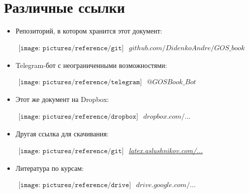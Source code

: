 {\let\clearpage\relax\chapter{Различные ссылки}}
\begin{itemize}
\item

Репозиторий, в котором хранится этот документ:

$
\begin{array}{l}
\texttt{[image: pictures/reference/git]}
\end{array}
$ \href{https://github.com/DidenkoAndre/GOS_book}{$github.com/DidenkoAndre/GOS\_book$}

\item

Telegram-бот с неограниченными возможностями:

$
\begin{array}{l}
\texttt{[image: pictures/reference/telegram]}
\end{array}
$
\href{https://t.me/GOSBook_Bot}{\textcolor{Purplemountainmajesty}{$@GOSBook\_Bot$}} 

\item

Этот же документ на Dropbox:

$
\begin{array}{l}
\texttt{[image: pictures/reference/dropbox]}
\end{array}
$ \href{https://www.dropbox.com/sh/7e5mfj8q68o2ipp/AAD8XvpZhiJzFbEh_IeH305ia?dl=0&preview=GOSBook.pdf}{$dropbox.com/...$}

\item 

Другая ссылка для скачивания:

$
\begin{array}{l}
\texttt{[image: pictures/reference/git]}
\end{array}
$
\href{http://latex.aslushnikov.com/compile?git=https://github.com/DidenkoAndre/GOS_book&target=GOSBook.tex}{\large \textcolor{Purplemountainmajesty}{\textit{latex.aslushnikov.com/...}}}

\item
Литература по курсам:

$
\begin{array}{l}
\texttt{[image: pictures/reference/drive]}
\end{array}
$
\href{https://drive.google.com/drive/u/0/folders/0BzuzEyNkpwYDcENXcV9jNWdwVlU}{$drive.google.com/...$}


\end{itemize}
